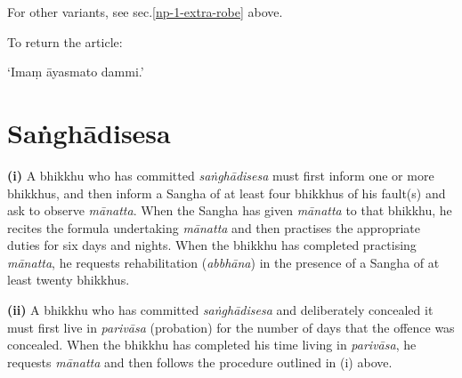 
For other variants, see sec.\ref{np-1-extra-robe} above.

To return the article:

‘Imaṃ āyasmato dammi.’

\section{Saṅghādisesa}

\textbf{(i)} A bhikkhu who has committed \emph{saṅghādisesa} must first inform
one or more bhikkhus, and then inform a Sangha of at least four bhikkhus of his
fault(s) and ask to observe \emph{mānatta}. When the Sangha has given
\emph{mānatta} to that bhikkhu, he recites the formula undertaking
\emph{mānatta} and then practises the appropriate duties for six days and
nights. When the bhikkhu has completed practising \emph{mānatta}, he requests
rehabilitation (\emph{abbhāna}) in the presence of a Sangha of at least twenty
bhikkhus.

\textbf{(ii)} A bhikkhu who has committed \emph{saṅghādisesa} and deliberately
concealed it must first live in \emph{parivāsa} (probation) for the number of
days that the offence was concealed. When the bhikkhu has completed his time
living in \emph{parivāsa}, he requests \emph{mānatta} and then follows the
procedure outlined in (i) above.

